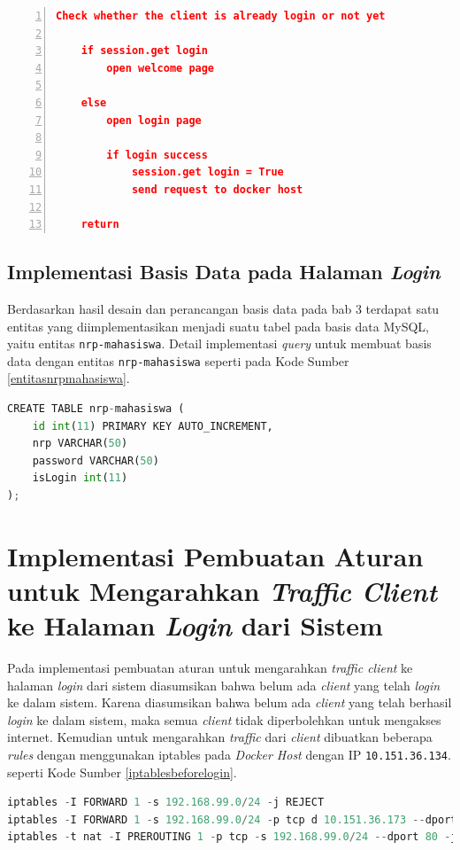 \begin{minipage}{\linewidth}  
	\begin{lstlisting}[numbers=left, frame=single,tabsize=2,breaklines,caption={Pseudocode Web Service},label=pseudocodehalamanlogin,language=json]
	Check whether the client is already login or not yet
	
	if session.get login
		open welcome page
		
	else
		open login page
		
		if login success
			session.get login = True
			send request to docker host
	
	return  	
	\end{lstlisting}
\end{minipage}


\subsection{Implementasi Basis Data pada Halaman \textit{Login}}
Berdasarkan hasil desain dan perancangan basis data pada bab 3 terdapat satu entitas yang diimplementasikan menjadi suatu tabel pada basis data MySQL, yaitu entitas \texttt{nrp-mahasiswa}. Detail implementasi \textit{query} untuk membuat basis data dengan entitas \texttt{nrp-mahasiswa} seperti pada Kode Sumber \ref{entitasnrpmahasiswa}.\\
\begin{lstlisting}[frame=single,tabsize=2,breaklines,captionpos=b,language=python, caption=\textit{Query} untuk membuat tabel testing,label=entitasnrpmahasiswa]
CREATE TABLE nrp-mahasiswa (
	id int(11) PRIMARY KEY AUTO_INCREMENT,
	nrp VARCHAR(50)
	password VARCHAR(50)
	isLogin int(11)
);
\end{lstlisting}


\section{Implementasi Pembuatan Aturan untuk Mengarahkan \textit{Traffic Client} ke Halaman \textit{Login} dari Sistem}
Pada implementasi pembuatan aturan untuk mengarahkan \textit{traffic client} ke halaman \textit{login} dari sistem diasumsikan bahwa belum ada \textit{client} yang telah \textit{login} ke dalam sistem. Karena diasumsikan bahwa belum ada \textit{client} yang telah berhasil \textit{login} ke dalam sistem, maka semua \textit{client} tidak diperbolehkan untuk mengakses internet. Kemudian untuk mengarahkan \textit{traffic} dari \textit{client} dibuatkan beberapa \textit{rules} dengan menggunakan iptables pada \textit{Docker Host} dengan IP \texttt{10.151.36.134}. seperti Kode Sumber \ref{iptablesbeforelogin}.
\begin{lstlisting}[frame=single,tabsize=2,breaklines,captionpos=b,caption=Command untuk mengarahkan \textit{client} ke halaman \textit{login},language=Python,label=iptablesbeforelogin]
iptables -I FORWARD 1 -s 192.168.99.0/24 -j REJECT
iptables -I FORWARD 1 -s 192.168.99.0/24 -p tcp d 10.151.36.173 --dport 4000 -j ACCEPT
iptables -t nat -I PREROUTING 1 -p tcp -s 192.168.99.0/24 --dport 80 -j DNAT --to 10.151.36.173:4000
\end{lstlisting}

